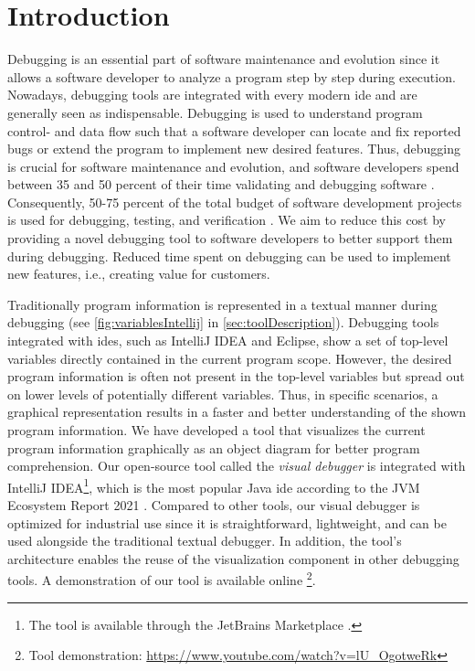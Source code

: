 \documentclass[conference]{IEEEtran}
\newcommand{\intellij}{IntelliJ IDEA}
\begin{document}
\section{Introduction}
Debugging is an essential part of software maintenance and evolution since it allows a software developer to analyze a program step by step during execution.
Nowadays, debugging tools are integrated with every modern \gls*{ide} and are generally seen as indispensable.
Debugging is used to understand program control- and data flow such that a software developer can locate and fix reported bugs or extend the program to implement new desired features.
Thus, debugging is crucial for software maintenance and evolution, and software developers spend between 35 and 50 percent of their time validating and debugging software \cite{odellDebuggingMindsetUnderstanding2017}.
Consequently, 50-75 percent of the total budget of software development projects is used for debugging, testing, and verification \cite{odellDebuggingMindsetUnderstanding2017}.
We aim to reduce this cost by providing a novel debugging tool to software developers to better support them during debugging.
Reduced time spent on debugging can be used to implement new features, i.e., creating value for customers.

Traditionally program information is represented in a textual manner during debugging (see \cref{fig:variablesIntellij} in \cref{sec:toolDescription}).
Debugging tools integrated with \glspl*{ide}, such as \intellij{} and Eclipse, show a set of top-level variables directly contained in the current program scope.
However, the desired program information is often not present in the top-level variables but spread out on lower levels of potentially different variables.
Thus, in specific scenarios, a graphical representation results in a faster and better understanding of the shown program information.
We have developed a tool that visualizes the current program information graphically as an object diagram for better program comprehension.
Our open-source tool called the \textit{visual debugger} is integrated with \intellij{}\footnote{The tool is available through the JetBrains Marketplace \cite{VisualDebuggerIntelliJ}.}, which is the most popular Java \gls*{ide} according to the JVM Ecosystem Report 2021 \cite{JVMEcosystemReport2021}.
Compared to other tools, our visual debugger is optimized for industrial use since it is straightforward, lightweight, and can be used alongside the traditional textual debugger.
In addition, the tool's architecture enables the reuse of the visualization component in other debugging tools.
A demonstration of our tool is available online \cite{ArtifactsICSME2022}\footnote{Tool demonstration: \url{https://www.youtube.com/watch?v=lU_OgotweRk}}.
\end{document}
